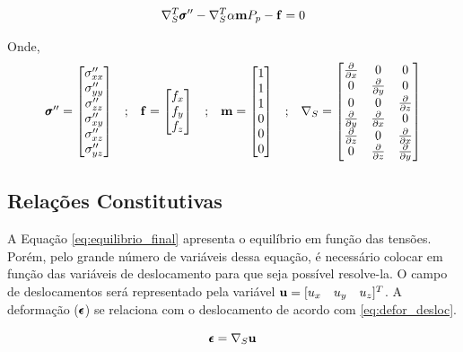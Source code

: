 \begin{equation}
\label{eq:equilibrio_final}
\sopnabla^T \stef - \sopnabla^T\alpha \mathbf{m}  P_p - \mathbf{f} = 0
\end{equation}

Onde,
\begin{equation}
\begin{matrix}\label{eq:definicoesvoigt}
\pmb{\sigma}^{\prime\prime} = \begin{bmatrix}
\sigma^{\prime\prime}_{xx}
\\
\sigma^{\prime\prime}_{yy}
\\
\sigma^{\prime\prime}_{zz}
\\
\sigma^{\prime\prime}_{xy}
\\
\sigma^{\prime\prime}_{xz}
\\
\sigma^{\prime\prime}_{yz}
\end{bmatrix}
&

;

&

\mathbf{f} = \begin{bmatrix}
f_{x}
\\
f_{y}
\\
f_{z}
\end{bmatrix}
&
;
&

\mathbf{m} = \begin{bmatrix} 1 \\ 1 \\ 1 \\ 0 \\ 0 \\ 0\end{bmatrix}

&
;

&
\nabla_S = \begin{bmatrix} \frac{\partial { }}{\partial x} & 0 & 0 \\ 0 & \frac{\partial { }}{\partial y} & 0 \\ 0 & 0 & \frac{\partial { }}{\partial z} \\ \frac{\partial { }}{\partial y} & \frac{\partial { }}{\partial x} & 0 \\ \frac{\partial { }}{\partial z} & 0 & \frac{\partial { }}{\partial x} \\ 0 & \frac{\partial { }}{\partial z} & \frac{\partial { }}{\partial y} \end{bmatrix}
\end{matrix}
\end{equation}



\subsection{Relações Constitutivas}

A Equação \eqref{eq:equilibrio_final} apresenta o equilíbrio em função das tensões. Porém, pelo grande número de variáveis dessa equação, é necessário colocar em função das variáveis de deslocamento para que seja possível resolve-la. O campo de deslocamentos será representado pela variável $\mathbf{u} = [u_x \quad u_y \quad u_z]^T$. A deformação ($\pmb{\epsilon}$) se relaciona com o deslocamento de acordo com \eqref{eq:defor_desloc}. 

\begin{equation}
\label{eq:defor_desloc}
\deformacao = \sopnabla \deslocamento
\end{equation}


